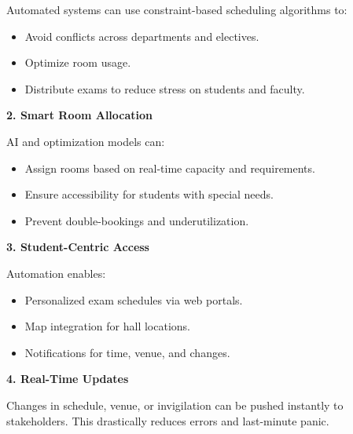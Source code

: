 \documentclass[a4paper,12pt]{article}
\begin{document}
Automated systems can use constraint-based scheduling algorithms to:

\begin{itemize}
\item Avoid conflicts across departments and electives.

\item Optimize room usage.

\item Distribute exams to reduce stress on students and faculty.
\end{itemize} 

\noindent\textbf{2. Smart Room Allocation}

AI and optimization models can:

\begin{itemize}
\item Assign rooms based on real-time capacity and requirements.

\item Ensure accessibility for students with special needs.

\item Prevent double-bookings and underutilization.
\end{itemize}

\noindent\textbf{3. Student-Centric Access}

Automation enables:

\begin{itemize}
\item Personalized exam schedules via web portals.

\item Map integration for hall locations.

\item Notifications for time, venue, and changes.
\end{itemize}

\noindent\textbf{4. Real-Time Updates}

Changes in schedule, venue, or invigilation can be pushed instantly to stakeholders. This drastically reduces errors and last-minute panic.


\end{document}

